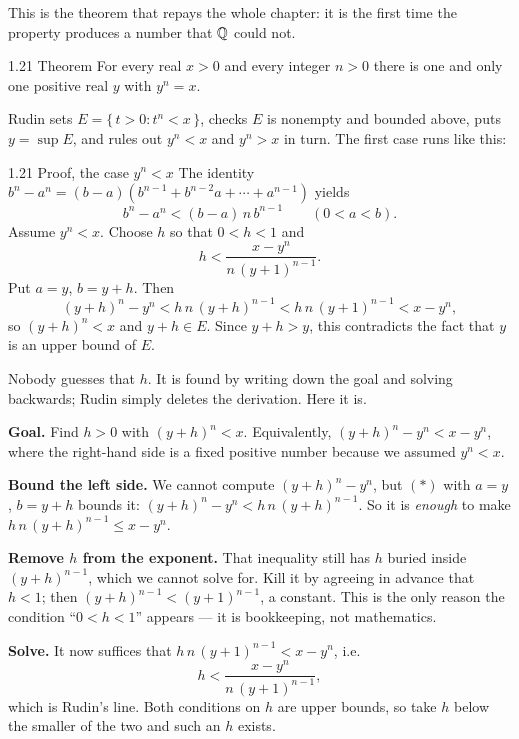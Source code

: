 \documentclass[11pt,twoside]{article}
\begin{document}
This is the theorem that repays the whole chapter: it is the first time the
\lub{} property produces a number that $\mathbb{Q}$ could not.

\begin{rudinbox}{\textsc{1.21} Theorem}
For every real $x > 0$ and every integer $n > 0$ there is one and only one
positive real $y$ with $y^n = x$.
\end{rudinbox}

Rudin sets $E = \{\, t > 0 : t^n < x \,\}$, checks $E$ is nonempty and bounded
above, puts $y = \sup E$, and rules out $y^n < x$ and $y^n > x$ in turn. The
first case runs like this:

\begin{rudinbox}{\textsc{1.21} Proof, the case $y^n < x$}
\upshape
The identity $b^n - a^n = (b-a)(b^{n-1} + b^{n-2}a + \cdots + a^{n-1})$ yields
\begin{equation}\tag{$\ast$}
  b^n - a^n < (b-a)\,n\,b^{n-1} \qquad (0 < a < b).
\end{equation}
Assume $y^n < x$. Choose $h$ so that $0 < h < 1$ and
\[
  h < \frac{x - y^n}{n\,(y+1)^{n-1}} .
\]
Put $a = y$, $b = y+h$. Then
\[
  (y+h)^n - y^n < h\,n\,(y+h)^{n-1} < h\,n\,(y+1)^{n-1} < x - y^n ,
\]
so $(y+h)^n < x$ and $y + h \in E$. Since $y+h > y$, this contradicts the fact
that $y$ is an upper bound of $E$.
\end{rudinbox}

\begin{unpack}
Nobody guesses that $h$. It is found by writing down the goal and solving
backwards; Rudin simply deletes the derivation. Here it is.

\smallskip
\textbf{Goal.} Find $h>0$ with $(y+h)^n < x$. Equivalently,
$(y+h)^n - y^n < x - y^n$, where the right-hand side is a fixed positive number
because we assumed $y^n < x$.

\smallskip
\textbf{Bound the left side.} We cannot compute $(y+h)^n - y^n$, but $(\ast)$
with $a = y$, $b = y+h$ bounds it: $(y+h)^n - y^n < h\,n\,(y+h)^{n-1}$. So it is
\emph{enough} to make $h\,n\,(y+h)^{n-1} \le x - y^n$.

\smallskip
\textbf{Remove $h$ from the exponent.} That inequality still has $h$ buried
inside $(y+h)^{n-1}$, which we cannot solve for. Kill it by agreeing in advance
that $h < 1$; then $(y+h)^{n-1} < (y+1)^{n-1}$, a constant. This is the only
reason the condition ``$0 < h < 1$'' appears --- it is bookkeeping, not
mathematics.

\smallskip
\textbf{Solve.} It now suffices that $h\,n\,(y+1)^{n-1} < x - y^n$, i.e.
\[
  h < \frac{x-y^n}{n\,(y+1)^{n-1}},
\]
which is Rudin's line. Both conditions on $h$ are upper bounds, so take $h$
below the smaller of the two and such an $h$ exists.
\end{unpack}
\end{document}
